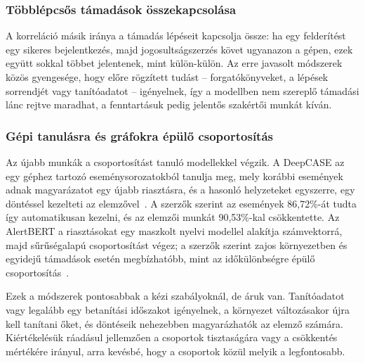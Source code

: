 \subsubsection{Többlépcsős támadások összekapcsolása}
A korreláció másik iránya a támadás lépéseit kapcsolja össze: ha egy felderítést egy sikeres bejelentkezés, majd jogosultságszerzés követ ugyanazon a gépen, ezek együtt sokkal többet jelentenek, mint külön-külön. Az erre javasolt módszerek közös gyengesége, hogy előre rögzített tudást -- forgatókönyveket, a lépések sorrendjét vagy tanítóadatot -- igényelnek, így a modellben nem szereplő támadási lánc rejtve maradhat, a fenntartásuk pedig jelentős szakértői munkát kíván.

\subsubsection{Gépi tanulásra és gráfokra épülő csoportosítás}
Az újabb munkák a csoportosítást tanuló modellekkel végzik. A DeepCASE az egy géphez tartozó eseménysorozatokból tanulja meg, mely korábbi események adnak magyarázatot egy újabb riasztásra, és a hasonló helyzeteket egyszerre, egy döntéssel kezelteti az elemzővel~\cite{vanede2022}. A szerzők szerint az események 86,72\%-át tudta így automatikusan kezelni, és az elemzői munkát 90,53\%-kal csökkentette. Az AlertBERT a riasztásokat egy maszkolt nyelvi modellel alakítja számvektorrá, majd sűrűségalapú csoportosítást végez; a szerzők szerint zajos környezetben és egyidejű támadások esetén megbízhatóbb, mint az időkülönbségre épülő csoportosítás~\cite{karner2026alertbert}.

Ezek a módszerek pontosabbak a kézi szabályoknál, de áruk van. Tanítóadatot vagy legalább egy betanítási időszakot igényelnek, a környezet változásakor újra kell tanítani őket, és döntéseik nehezebben magyarázhatók az elemző számára. Kiértékelésük ráadásul jellemzően a csoportok tisztaságára vagy a csökkentés mértékére irányul, arra kevésbé, hogy a csoportok közül melyik a legfontosabb.

